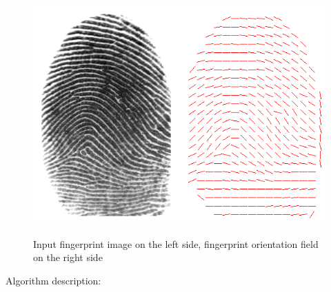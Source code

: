 \begin{figure}[H]
    \centering
        {\includegraphics[width=0.5\linewidth]{obrazky-figures/ori_navrh.png}}\\
        \caption{Input fingerprint image on the left side, fingerprint orientation field on the right side}
        \label{fig:ori_img}
\end{figure}

Algorithm description:

